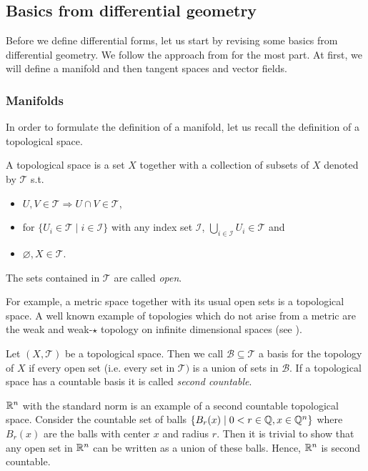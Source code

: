 \documentclass[../master_thesis.tex]{subfiles}
\begin{document}
\subsection{Basics from differential geometry}\label{sec:differential_geometry}

Before we define differential forms, let us start by revising some basics
from differential geometry. We follow the approach from 
\cite[Sec. II]{topology_and_geometry} for the most part. At first, we will define 
a manifold and then tangent spaces and vector fields.

\subsubsection{Manifolds}

In order to formulate the definition of a manifold, let us recall the 
definition of a topological space.
\begin{definition}
    A topological space is a set $X$ together with a collection of subsets of 
    $X$ denoted by $\mathcal{T}$ s.t.
    \begin{itemize}
        \item $U,V \in \mathcal{T} \Rightarrow U \cap V \in \mathcal{T}$,
        \item for $\{ U_i \in \mathcal{T} \mid i \in \mathcal{I} \}$
            with any index set $\mathcal{I}$, 
            $\bigcup_{i\in \mathcal{I}} U_i \in \mathcal{T}$ and
        \item $\varnothing, X \in \mathcal{T}$.
    \end{itemize}
    The sets contained in $\mathcal{T}$ are called \textit{open}.
\end{definition}
For example, a metric space together with its usual open sets is a topological
space. A well known example of topologies which do not arise from a metric
are the weak and weak-$\star$ topology on infinite dimensional spaces
(see \cite[Ch.\,3]{brezis}).

\begin{definition}
    Let $(X,\mathcal{T})$ be a topological space. Then we call 
    $\mathcal{B}\subseteq \mathcal{T}$ a basis for the topology of $X$ if 
    every open set (i.e. every set in $\mathcal{T})$ is a union of sets 
    in $\mathcal{B}$. If a topological space has a countable basis it is called
    \textit{second countable}.
\end{definition}
$\mathbb{R}^n$ with the standard norm is an example of a second countable topological space. Consider 
the countable set of balls $\{ B_r(x) \mid 0 < r \in \mathbb{Q}, x \in \mathbb{Q}^n\}$
where $ B_r(x)$ are the balls with center $x$ and radius $r$.
Then it is trivial to show that any open set in $\mathbb{R}^n$ can be written as a union of 
these balls. Hence, $\mathbb{R}^n$ is second countable.
\end{document}
